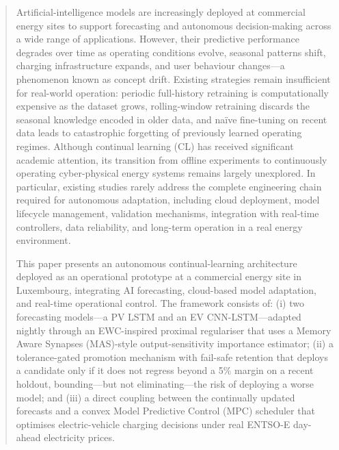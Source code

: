 \begin{abstract}
Artificial-intelligence models are increasingly deployed at commercial energy sites to support forecasting and autonomous decision-making across a wide range of applications. However, their predictive performance degrades over time as operating conditions evolve, seasonal patterns shift, charging infrastructure expands, and user behaviour changes---a phenomenon known as concept drift. Existing strategies remain insufficient for real-world operation: periodic full-history retraining is computationally expensive as the dataset grows, rolling-window retraining discards the seasonal knowledge encoded in older data, and na\"ive fine-tuning on recent data leads to catastrophic forgetting of previously learned operating regimes. Although continual learning (CL) has received significant academic attention, its transition from offline experiments to continuously operating cyber-physical energy systems remains largely unexplored. In particular, existing studies rarely address the complete engineering chain required for autonomous adaptation, including cloud deployment, model lifecycle management, validation mechanisms, integration with real-time controllers, data reliability, and long-term operation in a real energy environment.

This paper presents an autonomous continual-learning architecture deployed as an operational prototype at a commercial energy site in Luxembourg, integrating AI forecasting, cloud-based model adaptation, and real-time operational control. The framework consists of: (i) two forecasting models---a PV LSTM and an EV CNN-LSTM---adapted nightly through an EWC-inspired proximal regulariser that uses a Memory Aware Synapses (MAS)-style output-sensitivity importance estimator; (ii) a tolerance-gated promotion mechanism with fail-safe retention that deploys a candidate only if it does not regress beyond a 5\% margin on a recent holdout, bounding---but not eliminating---the risk of deploying a worse model; and (iii) a direct coupling between the continually updated forecasts and a convex Model Predictive Control (MPC) scheduler that optimises electric-vehicle charging decisions under real ENTSO-E day-ahead electricity prices.


\end{abstract}

